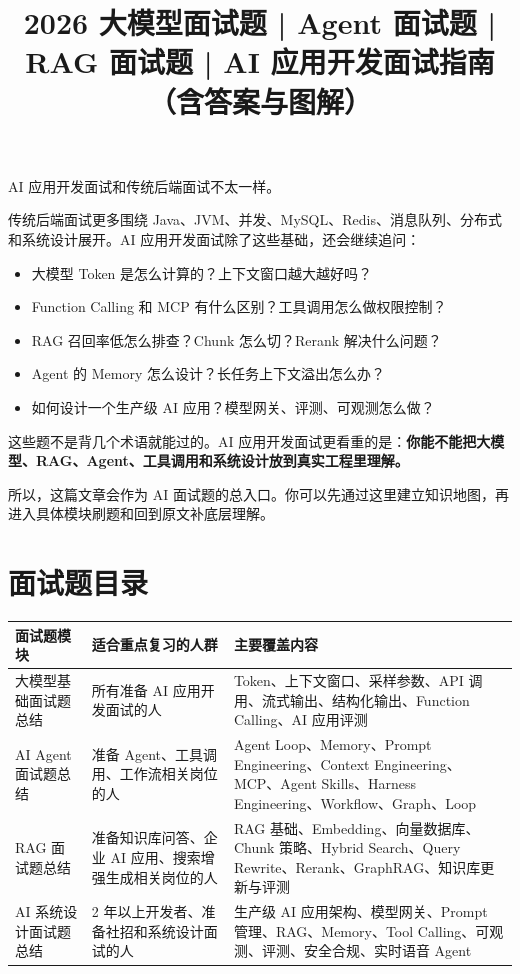 \documentclass[9pt,a4paper,twocolumn]{ctexart}
\begin{document}
\title{2026 大模型面试题 | Agent 面试题 | RAG 面试题 | AI 应用开发面试指南（含答案与图解）}
\date{}
\maketitle
{}

AI 应用开发面试和传统后端面试不太一样。



传统后端面试更多围绕 Java、JVM、并发、MySQL、Redis、消息队列、分布式和系统设计展开。AI 应用开发面试除了这些基础，还会继续追问：


\begin{itemize}[itemsep=1pt, topsep=2pt]
  \item 大模型 Token 是怎么计算的？上下文窗口越大越好吗？
  \item Function Calling 和 MCP 有什么区别？工具调用怎么做权限控制？
  \item RAG 召回率低怎么排查？Chunk 怎么切？Rerank 解决什么问题？
  \item Agent 的 Memory 怎么设计？长任务上下文溢出怎么办？
  \item 如何设计一个生产级 AI 应用？模型网关、评测、可观测怎么做？
\end{itemize}


这些题不是背几个术语就能过的。AI 应用开发面试更看重的是：\textbf{你能不能把大模型、RAG、Agent、工具调用和系统设计放到真实工程里理解。}



所以，这篇文章会作为 AI 面试题的总入口。你可以先通过这里建立知识地图，再进入具体模块刷题和回到原文补底层理解。



\section*{面试题目录}

{\footnotesize
\begin{tabular}{|p{}|p{}|p{}|}
\hline
\textbf{面试题模块} & \textbf{适合重点复习的人群} & \textbf{主要覆盖内容} \\
\hline
大模型基础面试题总结 & 所有准备 AI 应用开发面试的人 & Token、上下文窗口、采样参数、API 调用、流式输出、结构化输出、Function Calling、AI 应用评测 \\
\hline
AI Agent 面试题总结 & 准备 Agent、工具调用、工作流相关岗位的人 & Agent Loop、Memory、Prompt Engineering、Context Engineering、MCP、Agent Skills、Harness Engineering、Workflow、Graph、Loop \\
\hline
RAG 面试题总结 & 准备知识库问答、企业 AI 应用、搜索增强生成相关岗位的人 & RAG 基础、Embedding、向量数据库、Chunk 策略、Hybrid Search、Query Rewrite、Rerank、GraphRAG、知识库更新与评测 \\
\hline
AI 系统设计面试题总结 & 2 年以上开发者、准备社招和系统设计面试的人 & 生产级 AI 应用架构、模型网关、Prompt 管理、RAG、Memory、Tool Calling、可观测、评测、安全合规、实时语音 Agent \\
\hline
\end{tabular}
}
\end{document}
